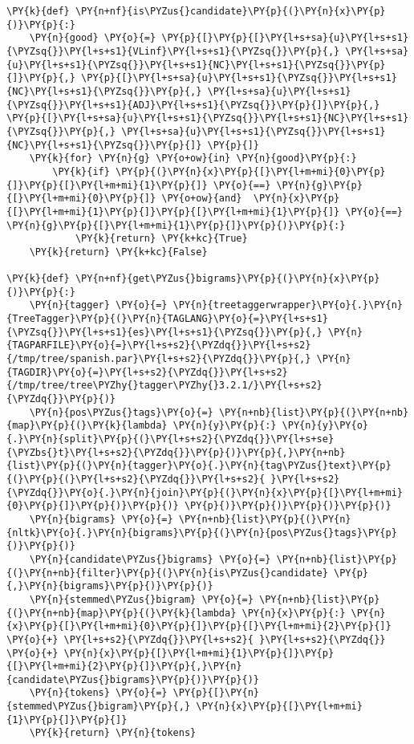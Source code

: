     \begin{tcolorbox}[breakable, size=fbox, boxrule=1pt, pad at break*=1mm,colback=cellbackground, colframe=cellborder]
\begin{Verbatim}[commandchars=\\\{\}]
\PY{k}{def} \PY{n+nf}{is\PYZus{}candidate}\PY{p}{(}\PY{n}{x}\PY{p}{)}\PY{p}{:}
	\PY{n}{good} \PY{o}{=} \PY{p}{[}\PY{p}{[}\PY{l+s+sa}{u}\PY{l+s+s1}{\PYZsq{}}\PY{l+s+s1}{VLinf}\PY{l+s+s1}{\PYZsq{}}\PY{p}{,} \PY{l+s+sa}{u}\PY{l+s+s1}{\PYZsq{}}\PY{l+s+s1}{NC}\PY{l+s+s1}{\PYZsq{}}\PY{p}{]}\PY{p}{,} \PY{p}{[}\PY{l+s+sa}{u}\PY{l+s+s1}{\PYZsq{}}\PY{l+s+s1}{NC}\PY{l+s+s1}{\PYZsq{}}\PY{p}{,} \PY{l+s+sa}{u}\PY{l+s+s1}{\PYZsq{}}\PY{l+s+s1}{ADJ}\PY{l+s+s1}{\PYZsq{}}\PY{p}{]}\PY{p}{,} \PY{p}{[}\PY{l+s+sa}{u}\PY{l+s+s1}{\PYZsq{}}\PY{l+s+s1}{NC}\PY{l+s+s1}{\PYZsq{}}\PY{p}{,} \PY{l+s+sa}{u}\PY{l+s+s1}{\PYZsq{}}\PY{l+s+s1}{NC}\PY{l+s+s1}{\PYZsq{}}\PY{p}{]} \PY{p}{]}
	\PY{k}{for} \PY{n}{g} \PY{o+ow}{in} \PY{n}{good}\PY{p}{:}
		\PY{k}{if} \PY{p}{(}\PY{n}{x}\PY{p}{[}\PY{l+m+mi}{0}\PY{p}{]}\PY{p}{[}\PY{l+m+mi}{1}\PY{p}{]} \PY{o}{==} \PY{n}{g}\PY{p}{[}\PY{l+m+mi}{0}\PY{p}{]} \PY{o+ow}{and}  \PY{n}{x}\PY{p}{[}\PY{l+m+mi}{1}\PY{p}{]}\PY{p}{[}\PY{l+m+mi}{1}\PY{p}{]} \PY{o}{==} \PY{n}{g}\PY{p}{[}\PY{l+m+mi}{1}\PY{p}{]}\PY{p}{)}\PY{p}{:}
			\PY{k}{return} \PY{k+kc}{True}
	\PY{k}{return} \PY{k+kc}{False}
	
\PY{k}{def} \PY{n+nf}{get\PYZus{}bigrams}\PY{p}{(}\PY{n}{x}\PY{p}{)}\PY{p}{:}
	\PY{n}{tagger} \PY{o}{=} \PY{n}{treetaggerwrapper}\PY{o}{.}\PY{n}{TreeTagger}\PY{p}{(}\PY{n}{TAGLANG}\PY{o}{=}\PY{l+s+s1}{\PYZsq{}}\PY{l+s+s1}{es}\PY{l+s+s1}{\PYZsq{}}\PY{p}{,} \PY{n}{TAGPARFILE}\PY{o}{=}\PY{l+s+s2}{\PYZdq{}}\PY{l+s+s2}{/tmp/tree/spanish.par}\PY{l+s+s2}{\PYZdq{}}\PY{p}{,} \PY{n}{TAGDIR}\PY{o}{=}\PY{l+s+s2}{\PYZdq{}}\PY{l+s+s2}{/tmp/tree/tree\PYZhy{}tagger\PYZhy{}3.2.1/}\PY{l+s+s2}{\PYZdq{}}\PY{p}{)}
	\PY{n}{pos\PYZus{}tags}\PY{o}{=} \PY{n+nb}{list}\PY{p}{(}\PY{n+nb}{map}\PY{p}{(}\PY{k}{lambda} \PY{n}{y}\PY{p}{:} \PY{n}{y}\PY{o}{.}\PY{n}{split}\PY{p}{(}\PY{l+s+s2}{\PYZdq{}}\PY{l+s+se}{\PYZbs{}t}\PY{l+s+s2}{\PYZdq{}}\PY{p}{)}\PY{p}{,}\PY{n+nb}{list}\PY{p}{(}\PY{n}{tagger}\PY{o}{.}\PY{n}{tag\PYZus{}text}\PY{p}{(}\PY{p}{(}\PY{l+s+s2}{\PYZdq{}}\PY{l+s+s2}{ }\PY{l+s+s2}{\PYZdq{}}\PY{o}{.}\PY{n}{join}\PY{p}{(}\PY{n}{x}\PY{p}{[}\PY{l+m+mi}{0}\PY{p}{]}\PY{p}{)}\PY{p}{)} \PY{p}{)}\PY{p}{)}\PY{p}{)}\PY{p}{)}
	\PY{n}{bigrams} \PY{o}{=} \PY{n+nb}{list}\PY{p}{(}\PY{n}{nltk}\PY{o}{.}\PY{n}{bigrams}\PY{p}{(}\PY{n}{pos\PYZus{}tags}\PY{p}{)}\PY{p}{)}
	\PY{n}{candidate\PYZus{}bigrams} \PY{o}{=} \PY{n+nb}{list}\PY{p}{(}\PY{n+nb}{filter}\PY{p}{(}\PY{n}{is\PYZus{}candidate} \PY{p}{,}\PY{n}{bigrams}\PY{p}{)}\PY{p}{)}
	\PY{n}{stemmed\PYZus{}bigram} \PY{o}{=} \PY{n+nb}{list}\PY{p}{(}\PY{n+nb}{map}\PY{p}{(}\PY{k}{lambda} \PY{n}{x}\PY{p}{:} \PY{n}{x}\PY{p}{[}\PY{l+m+mi}{0}\PY{p}{]}\PY{p}{[}\PY{l+m+mi}{2}\PY{p}{]}  \PY{o}{+} \PY{l+s+s2}{\PYZdq{}}\PY{l+s+s2}{ }\PY{l+s+s2}{\PYZdq{}} \PY{o}{+} \PY{n}{x}\PY{p}{[}\PY{l+m+mi}{1}\PY{p}{]}\PY{p}{[}\PY{l+m+mi}{2}\PY{p}{]}\PY{p}{,}\PY{n}{candidate\PYZus{}bigrams}\PY{p}{)}\PY{p}{)}
	\PY{n}{tokens} \PY{o}{=} \PY{p}{[}\PY{n}{stemmed\PYZus{}bigram}\PY{p}{,} \PY{n}{x}\PY{p}{[}\PY{l+m+mi}{1}\PY{p}{]}\PY{p}{]}
	\PY{k}{return} \PY{n}{tokens}


\end{Verbatim}
\end{tcolorbox}
